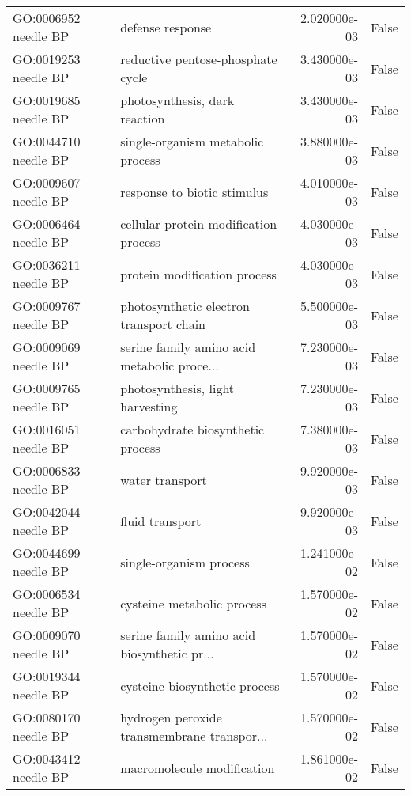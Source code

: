 \begin{tabular}{llrl}
GO:0006952 needle BP       &                             defense response &   2.020000e-03 &  False \\
GO:0019253 needle BP       &            reductive pentose-phosphate cycle &   3.430000e-03 &  False \\
GO:0019685 needle BP       &                photosynthesis, dark reaction &   3.430000e-03 &  False \\
GO:0044710 needle BP       &            single-organism metabolic process &   3.880000e-03 &  False \\
GO:0009607 needle BP       &                  response to biotic stimulus &   4.010000e-03 &  False \\
GO:0006464 needle BP       &        cellular protein modification process &   4.030000e-03 &  False \\
GO:0036211 needle BP       &                 protein modification process &   4.030000e-03 &  False \\
GO:0009767 needle BP       &      photosynthetic electron transport chain &   5.500000e-03 &  False \\
GO:0009069 needle BP       &  serine family amino acid metabolic proce... &   7.230000e-03 &  False \\
GO:0009765 needle BP       &             photosynthesis, light harvesting &   7.230000e-03 &  False \\
GO:0016051 needle BP       &            carbohydrate biosynthetic process &   7.380000e-03 &  False \\
GO:0006833 needle BP       &                              water transport &   9.920000e-03 &  False \\
GO:0042044 needle BP       &                              fluid transport &   9.920000e-03 &  False \\
GO:0044699 needle BP       &                      single-organism process &   1.241000e-02 &  False \\
GO:0006534 needle BP       &                   cysteine metabolic process &   1.570000e-02 &  False \\
GO:0009070 needle BP       &  serine family amino acid biosynthetic pr... &   1.570000e-02 &  False \\
GO:0019344 needle BP       &                cysteine biosynthetic process &   1.570000e-02 &  False \\
GO:0080170 needle BP       &  hydrogen peroxide transmembrane transpor... &   1.570000e-02 &  False \\
GO:0043412 needle BP       &                   macromolecule modification &   1.861000e-02 &  False \\

\end{tabular}
